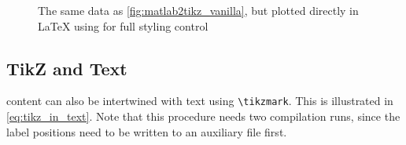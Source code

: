 \begin{figure}[tbp]
    \caption[A MATLAB2Ti\textit{k}Z plot recreated in \LaTeX{}]{%
        The same data as \cref{fig:matlab2tikz_vanilla}, but plotted directly in
        \LaTeX{} using  for full styling control%
    }
    \label{fig:matlab2tikz_pgfplots}
\end{figure}

\subsection{TikZ and Text}

 content can also be intertwined with text using \verb|\tikzmark|.
This is illustrated in \cref{eq:tikz_in_text}.
Note that this procedure needs two compilation runs, since the label positions
need to be written to an auxiliary file first.


